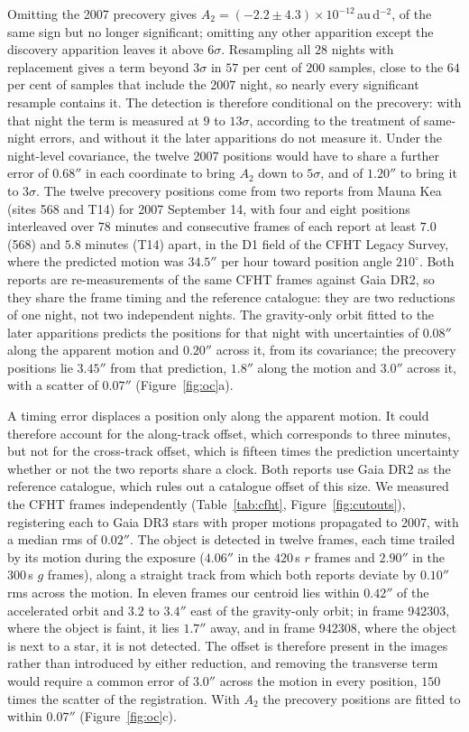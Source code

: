 \documentclass[3p,11pt]{elsarticle}
\begin{document}
Omitting the 2007 precovery gives $A_2=(-2.2\pm4.3)\times10^{-12}$\,au\,d$^{-2}$, of the
same sign but no longer significant; omitting any other apparition except the discovery
apparition leaves it above $6\sigma$. Resampling all $28$ nights with replacement gives a
term beyond $3\sigma$ in $57$ per cent of $200$ samples, close to the $64$ per cent of
samples that include the 2007 night, so nearly every significant resample contains it.
The detection is therefore conditional on the precovery: with that night the term is
measured at $9$ to $13\sigma$, according to the treatment of same-night errors, and
without it the later apparitions do not measure it. Under the night-level covariance, the
twelve 2007 positions would have to share a further error of $0.68''$ in each coordinate
to bring $A_2$ down to $5\sigma$, and of $1.20''$ to bring it to $3\sigma$. The twelve precovery positions come from two reports
from Mauna Kea (sites 568 and T14) for 2007 September 14, with four and eight positions
interleaved over $78$ minutes and consecutive frames of each report at least $7.0$ (568)
and $5.8$ minutes (T14) apart, in the D1 field of the CFHT Legacy Survey, where the
predicted motion was $34.5''$ per hour toward position angle $210^\circ$. Both reports are
re-measurements of the same CFHT frames against Gaia DR2, so they share the frame timing
and the reference catalogue: they are two reductions of one night, not two independent
nights. The gravity-only orbit fitted to the later apparitions predicts the positions for
that night with uncertainties of $0.08''$ along the apparent motion and $0.20''$ across
it, from its covariance; the precovery positions lie $3.45''$ from that prediction,
$1.8''$ along the motion and $3.0''$ across it, with a scatter of $0.07''$
(Figure~\ref{fig:oc}a).

A timing error displaces a position only along the apparent motion. It could therefore
account for the along-track offset, which corresponds to three minutes, but not for the
cross-track offset, which is fifteen times the prediction uncertainty whether or not the
two reports share a clock. Both reports use Gaia DR2 as the reference catalogue, which
rules out a catalogue offset of this size. We measured the CFHT frames independently
(Table~\ref{tab:cfht}, Figure~\ref{fig:cutouts}), registering each to Gaia DR3 stars with
proper motions propagated to 2007, with a median rms of $0.02''$. The object is detected
in twelve frames, each time trailed by its motion during the exposure ($4.06''$ in the
$420$\,s $r$ frames and $2.90''$ in the $300$\,s $g$ frames), along a straight track
from which both reports deviate by $0.10''$ rms across the motion. In eleven frames our
centroid lies within $0.42''$ of the accelerated orbit and $3.2$ to $3.4''$ east of the
gravity-only orbit; in frame 942303, where the object is faint, it lies $1.7''$ away, and
in frame 942308, where the object is next to a star, it is not detected. The offset is
therefore present in the images rather than introduced by either reduction, and removing
the transverse term would require a common error of $3.0''$ across the motion in every
position, $150$ times the scatter of the registration. With $A_2$ the precovery positions
are fitted to within $0.07''$ (Figure~\ref{fig:oc}c).
\end{document}
